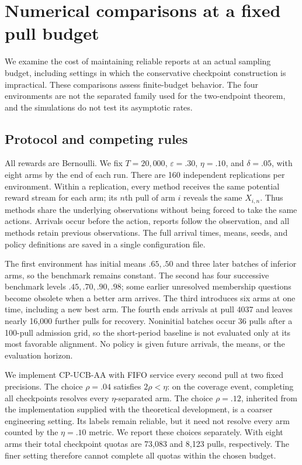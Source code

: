 \section{Numerical comparisons at a fixed pull budget}
\label{sec:experiments}

We examine the cost of maintaining reliable reports at an actual sampling
budget, including settings in which the conservative checkpoint construction
is impractical. These comparisons assess finite-budget behavior. The four
environments are not the separated family used for the two-endpoint theorem,
and the simulations do not test its asymptotic rates.

\subsection{Protocol and competing rules}

All rewards are Bernoulli. We fix $T=20{,}000$, $\varepsilon=.30$,
$\eta=.10$, and $\delta=.05$, with eight arms by the end of each run.
There are 160 independent replications per environment. Within a replication,
every method receives the same potential reward stream for each arm; its
$n$th pull of arm $i$ reveals the same $X_{i,n}$. Thus methods share the
underlying observations without being forced to take the same actions.
Arrivals occur before the action, reports follow the observation, and all
methods retain previous observations. The full arrival times, means, seeds,
and policy definitions are saved in a single configuration file.

The first environment has initial means $.65,.50$ and three later batches of
inferior arms, so the benchmark remains constant. The second has four
successive benchmark levels $.45,.70,.90,.98$; some earlier unresolved
membership questions become obsolete when a better arm arrives. The third
introduces six arms at one time, including a new best arm. The fourth ends
arrivals at pull 4037 and leaves nearly 16,000 further pulls for recovery.
Noninitial batches occur 36 pulls after a 100-pull admission grid, so the
short-period baseline is not evaluated only at its most favorable alignment.
No policy is given future arrivals, the means, or the evaluation horizon.

We implement CP-UCB-AA with FIFO service every second pull at two fixed
precisions. The choice $\rho=.04$ satisfies $2\rho<\eta$: on the coverage
event, completing all checkpoints resolves every $\eta$-separated arm.
The choice $\rho=.12$, inherited from the implementation supplied with the
theoretical development, is a coarser engineering setting. Its labels remain
reliable, but it need not resolve every arm counted by the $\eta=.10$ metric.
We report these choices separately. With eight arms their total checkpoint
quotas are 73,083 and 8,123 pulls, respectively. The finer setting therefore
cannot complete all quotas within the chosen budget.

